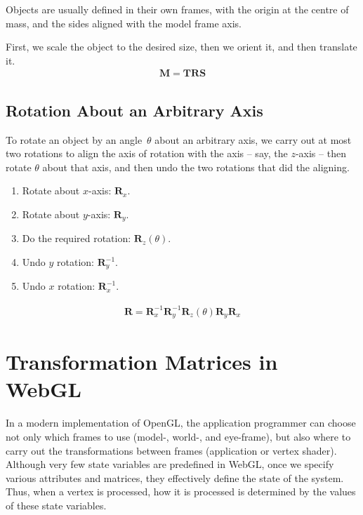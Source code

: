 \documentclass[../COS3712_Notes.tex]{subfiles}
\begin{document}
        Objects are usually defined in their own frames, with the origin at the centre of mass,
        and the sides aligned with the model frame axis.

        First, we scale the object to the desired size, then we orient it, and then translate it.
        \begin{align*}
          \mathbf{M} = \mathbf{TRS}
        \end{align*}

      \subsection{Rotation About an Arbitrary Axis}
        To rotate an object by an angle~$\theta$ about an arbitrary axis, we carry out at most
        two rotations to align the axis of rotation with the axis -- say, the $z$-axis --
        then rotate $\theta$ about that axis, and then undo the two rotations that
        did the aligning.

        \begin{enumerate}[nosep]
          \item Rotate about $x$-axis: $\mathbf{R}_x$.
          \item Rotate about $y$-axis: $\mathbf{R}_y$.
          \item Do the required rotation: $\mathbf{R}_z(\theta)$.
          \item Undo $y$ rotation: $\mathbf{R}^{-1}_y$.
          \item Undo $x$ rotation: $\mathbf{R}^{-1}_x$.
        \end{enumerate}
        \begin{align*}
          \mathbf{R} = \mathbf{R}^{-1}_x \mathbf{R}^{-1}_y \mathbf{R}_z(\theta) \mathbf{R}_y \mathbf{R}_x
        \end{align*}

    \pagebreak

    \section{Transformation Matrices in WebGL}
      In a modern implementation of OpenGL, the application programmer can choose not only
      which frames to use
      (model-, world-, and eye-frame),
      but also where to carry out the transformations between frames
      (application or vertex shader).
      Although very few state variables are predefined in WebGL, once we specify various
      attributes and matrices, they effectively define the state of the system.
      Thus, when a vertex is processed, how it is processed is determined by the values
      of these state variables.
\end{document}
